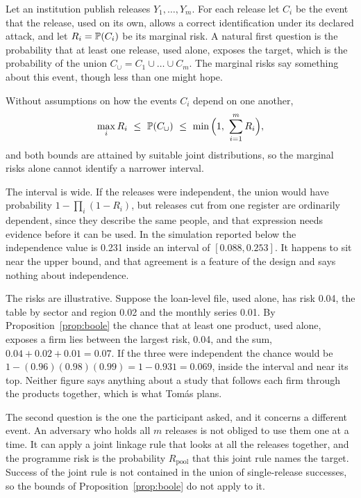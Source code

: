 Let an institution publish releases $Y_1,\dots,Y_m$. For each release let $C_i$ be
the event that the release, used on its own, allows a correct identification under
its declared attack, and let $R_i = \mathbb{P}(C_i)$ be its marginal risk. A natural
first question is the probability that at least one release, used alone, exposes
the target, which is the probability of the union
$C_\cup = C_1 \cup \dots \cup C_m$. The marginal risks say something about this
event, though less than one might hope.

\begin{proposition}\label{prop:boole}
Without assumptions on how the events $C_i$ depend on one another,
\begin{equation}\label{eq:boole}
\max_i R_i \ \le\ \mathbb{P}(C_\cup)\ \le\ \min\Big(1,\ \sum_{i=1}^m R_i\Big),
\end{equation}
and both bounds are attained by suitable joint distributions, so the marginal risks
alone cannot identify a narrower interval.
\end{proposition}

The interval is wide. If the releases were independent, the union would have
probability $1 - \prod_i (1 - R_i)$, but releases cut from one register are
ordinarily dependent, since they describe the same people, and that expression
needs evidence before it can be used. In the simulation reported below the
independence value is 0.231 inside an interval of $[0.088, 0.253]$. It happens to
sit near the upper bound, and that agreement is a feature of the design and says
nothing about independence.

\begin{example}\label{ex:three-products}
The risks are illustrative. Suppose the loan-level file, used alone, has risk 0.04, the
table by sector and region 0.02 and the monthly series 0.01. By
Proposition~\ref{prop:boole} the chance that at least one product, used alone, exposes a
firm lies between the largest risk, 0.04, and the sum, $0.04 + 0.02 + 0.01 = 0.07$. If
the three were independent the chance would be $1 - (0.96)(0.98)(0.99) = 1 - 0.931 =
0.069$, inside the interval and near its top. Neither figure says anything about a study
that follows each firm through the products together, which is what Tom\'as plans.
\end{example}

The second question is the one the participant asked, and it concerns a different
event. An adversary who holds all $m$ releases is not obliged to use them one at a
time. It can apply a joint linkage rule that looks at all the releases together, and
the programme risk is the probability $R_{\mathrm{pool}}$ that this joint rule names
the target. Success of the joint rule is not contained in the union of single-release
successes, so the bounds of Proposition~\ref{prop:boole} do not apply to it.

